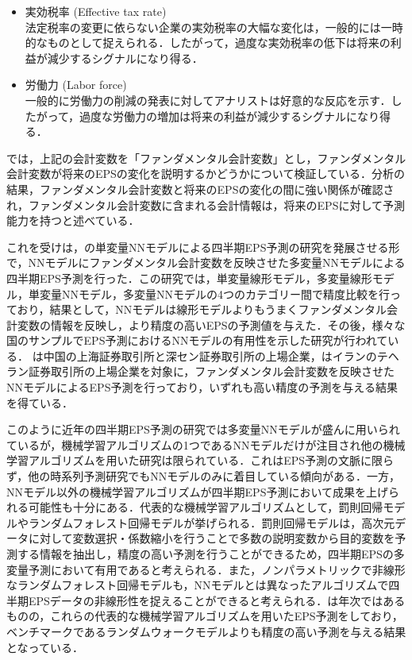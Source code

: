 \documentclass[a4paper，12pt]{jsarticle}
\begin{document}
\begin{itemize}
\item 実効税率 (Effective tax rate) \\
    法定税率の変更に依らない企業の実効税率の大幅な変化は，一般的には一時的なものとして捉えられる．したがって，過度な実効税率の低下は将来の利益が減少するシグナルになり得る．

\item 労働力 (Labor force) \\
    一般的に労働力の削減の発表に対してアナリストは好意的な反応を示す．したがって，過度な労働力の増加は将来の利益が減少するシグナルになり得る．
\end{itemize}

\cite*{abarbanell1997fundamental}では，上記の会計変数を「ファンダメンタル会計変数」とし，ファンダメンタル会計変数が将来のEPSの変化を説明するかどうかについて検証している．分析の結果，ファンダメンタル会計変数と将来のEPSの変化の間に強い関係が確認され，ファンダメンタル会計変数に含まれる会計情報は，将来のEPSに対して予測能力を持つと述べている．

これを受け\cite{zhang2004neural}は，\cite{callen1996neural}の単変量NNモデルによる四半期EPS予測の研究を発展させる形で，NNモデルにファンダメンタル会計変数を反映させた多変量NNモデルによる四半期EPS予測を行った．この研究では，単変量線形モデル，多変量線形モデル，単変量NNモデル，多変量NNモデルの4つのカテゴリー間で精度比較を行っており，結果として，NNモデルは線形モデルよりもうまくファンダメンタル会計変数の情報を反映し，より精度の高いEPSの予測値を与えた．その後，様々な国のサンプルでEPS予測におけるNNモデルの有用性を示した研究が行われている．\cite*{cao2009forecasting} は中国の上海証券取引所と深セン証券取引所の上場企業，\cite{etemadi2015earnings}はイランのテヘラン証券取引所の上場企業を対象に，ファンダメンタル会計変数を反映させたNNモデルによるEPS予測を行っており，いずれも高い精度の予測を与える結果を得ている．

このように近年の四半期EPS予測の研究では多変量NNモデルが盛んに用いられているが，機械学習アルゴリズムの1つであるNNモデルだけが注目され他の機械学習アルゴリズムを用いた研究は限られている．これはEPS予測の文脈に限らず，他の時系列予測研究でもNNモデルのみに着目している傾向がある\citep{ahmed2010empirical}．一方，NNモデル以外の機械学習アルゴリズムが四半期EPS予測において成果を上げられる可能性も十分にある．代表的な機械学習アルゴリズムとして，罰則回帰モデルやランダムフォレスト回帰モデルが挙げられる\citep{hastie2009esl}．罰則回帰モデルは，高次元データに対して変数選択・係数縮小を行うことで多数の説明変数から目的変数を予測する情報を抽出し，精度の高い予測を行うことができるため，四半期EPSの多変量予測において有用であると考えられる．また，ノンパラメトリックで非線形なランダムフォレスト回帰モデル\citep{breiman2001random}も，NNモデルとは異なったアルゴリズムで四半期EPSデータの非線形性を捉えることができると考えられる．\cite*{cao2020fundamental}は年次ではあるものの，これらの代表的な機械学習アルゴリズムを用いたEPS予測をしており，ベンチマークであるランダムウォークモデルよりも精度の高い予測を与える結果となっている．
\end{document}
